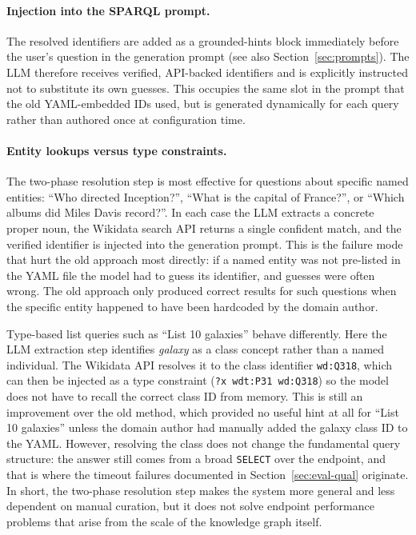 \documentclass[11pt,a4paper]{article}
\begin{document}
\paragraph{Injection into the SPARQL prompt.}
The resolved identifiers are added as a grounded-hints block immediately before the user's question in the generation prompt (see also Section~\ref{sec:prompts}). The LLM therefore receives verified, API-backed identifiers and is explicitly instructed not to substitute its own guesses. This occupies the same slot in the prompt that the old YAML-embedded IDs used, but is generated dynamically for each query rather than authored once at configuration time.

\paragraph{Entity lookups versus type constraints.}
The two-phase resolution step is most effective for questions about specific named entities: ``Who directed Inception?'', ``What is the capital of France?'', or ``Which albums did Miles Davis record?''. In each case the LLM extracts a concrete proper noun, the Wikidata search API returns a single confident match, and the verified identifier is injected into the generation prompt. This is the failure mode that hurt the old approach most directly: if a named entity was not pre-listed in the YAML file the model had to guess its identifier, and guesses were often wrong. The old approach only produced correct results for such questions when the specific entity happened to have been hardcoded by the domain author.

Type-based list queries such as ``List 10 galaxies'' behave differently. Here the LLM extraction step identifies \emph{galaxy} as a class concept rather than a named individual. The Wikidata API resolves it to the class identifier \texttt{wd:Q318}, which can then be injected as a type constraint (\texttt{?x\,wdt:P31\,wd:Q318}) so the model does not have to recall the correct class ID from memory. This is still an improvement over the old method, which provided no useful hint at all for ``List 10 galaxies'' unless the domain author had manually added the galaxy class ID to the YAML. However, resolving the class does not change the fundamental query structure: the answer still comes from a broad \texttt{SELECT} over the endpoint, and that is where the timeout failures documented in Section~\ref{sec:eval-qual} originate. In short, the two-phase resolution step makes the system more general and less dependent on manual curation, but it does not solve endpoint performance problems that arise from the scale of the knowledge graph itself.
\end{document}
